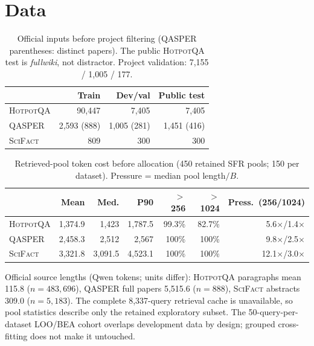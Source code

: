 \documentclass[10pt,twocolumn,letterpaper]{article}
\newcommand{\hotpot}{\textsc{HotpotQA}\xspace}
\newcommand{\qasper}{\textsc{QASPER}\xspace}
\newcommand{\scifact}{\textsc{SciFact}\xspace}
\begin{document}
\section{Data}\label{app:data}
\begin{table}[H]\centering\small\setlength{\tabcolsep}{5pt}
\caption{Official inputs before project filtering (QASPER parentheses: distinct papers). The public \hotpot test is \emph{fullwiki}, not distractor. Project validation: 7,155 / 1,005 / 177.}\label{tab:official}
\begin{tabular}{lrrr}\toprule
& Train & Dev/val & Public test\\\midrule
\hotpot & 90,447 & 7,405 & 7,405\\
\qasper & 2,593 (888) & 1,005 (281) & 1,451 (416)\\
\scifact & 809 & 300 & 300\\\bottomrule
\end{tabular}\end{table}
\begin{table}[H]\centering\small\setlength{\tabcolsep}{5pt}
\caption{Retrieved-pool token cost before allocation (450 retained SFR pools; 150 per dataset). Pressure = median pool length$/B$.}\label{tab:pool}
\begin{tabular}{lrrrrrr}\toprule
& Mean & Med. & P90 & $>$256 & $>$1024 & Press.\ (256/1024)\\\midrule
\hotpot & 1,374.9 & 1,423 & 1,787.5 & 99.3\% & 82.7\% & 5.6$\times$/1.4$\times$\\
\qasper & 2,458.3 & 2,512 & 2,567 & 100\% & 100\% & 9.8$\times$/2.5$\times$\\
\scifact & 3,321.8 & 3,091.5 & 4,523.1 & 100\% & 100\% & 12.1$\times$/3.0$\times$\\\bottomrule
\end{tabular}\end{table}
Official source lengths (Qwen tokens; units differ): \hotpot paragraphs mean 115.8 ($n{=}483{,}696$), \qasper full papers 5,515.6 ($n{=}888$), \scifact abstracts 309.0 ($n{=}5{,}183$). The complete 8,337-query retrieval cache is unavailable, so pool statistics describe only the retained exploratory subset. The 50-query-per-dataset LOO/BEA cohort overlaps development data by design; grouped cross-fitting does not make it untouched.
\end{document}
